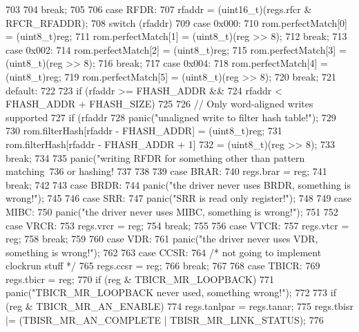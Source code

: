 \begin{DoxyCode}
{{{703 
704             break;
705 
706           case RFDR:
707             rfaddr = (uint16_t)(regs.rfcr & RFCR_RFADDR);
708             switch (rfaddr) {
709               case 0x000:
710                 rom.perfectMatch[0] = (uint8_t)reg;
711                 rom.perfectMatch[1] = (uint8_t)(reg >> 8);
712                 break;
713               case 0x002:
714                 rom.perfectMatch[2] = (uint8_t)reg;
715                 rom.perfectMatch[3] = (uint8_t)(reg >> 8);
716                 break;
717               case 0x004:
718                 rom.perfectMatch[4] = (uint8_t)reg;
719                 rom.perfectMatch[5] = (uint8_t)(reg >> 8);
720                 break;
721               default:
722 
723                 if (rfaddr >= FHASH_ADDR &&
724                     rfaddr < FHASH_ADDR + FHASH_SIZE) {
725 
726                     // Only word-aligned writes supported
727                     if (rfaddr %
728                         panic("unaligned write to filter hash table!");
729 
730                     rom.filterHash[rfaddr - FHASH_ADDR] = (uint8_t)reg;
731                     rom.filterHash[rfaddr - FHASH_ADDR + 1]
732                         = (uint8_t)(reg >> 8);
733                     break;
734                 }
735                 panic("writing RFDR for something other than pattern matching\
736                     or hashing! %
737             }
738 
739           case BRAR:
740             regs.brar = reg;
741             break;
742 
743           case BRDR:
744             panic("the driver never uses BRDR, something is wrong!\n");
745 
746           case SRR:
747             panic("SRR is read only register!\n");
748 
749           case MIBC:
750             panic("the driver never uses MIBC, something is wrong!\n");
751 
752           case VRCR:
753             regs.vrcr = reg;
754             break;
755 
756           case VTCR:
757             regs.vtcr = reg;
758             break;
759 
760           case VDR:
761             panic("the driver never uses VDR, something is wrong!\n");
762 
763           case CCSR:
764             /* not going to implement clockrun stuff */
765             regs.ccsr = reg;
766             break;
767 
768           case TBICR:
769             regs.tbicr = reg;
770             if (reg & TBICR_MR_LOOPBACK)
771                 panic("TBICR_MR_LOOPBACK never used, something wrong!\n");
772 
773             if (reg & TBICR_MR_AN_ENABLE) {
774                 regs.tanlpar = regs.tanar;
775                 regs.tbisr |= (TBISR_MR_AN_COMPLETE | TBISR_MR_LINK_STATUS);
776             }
}}}
\end{DoxyCode}
